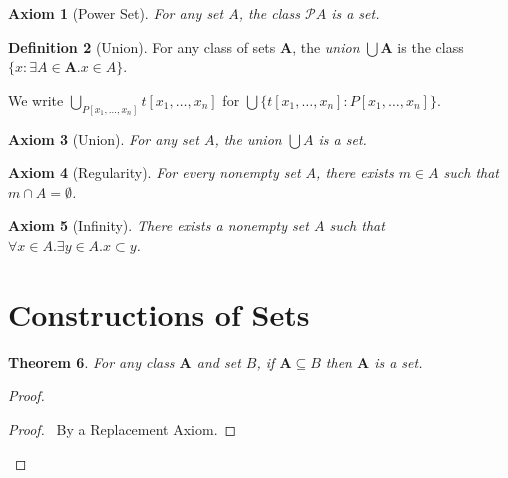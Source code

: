 \documentclass{report}
\let\qed\relax
\newtheorem{axiom}{Axiom}[section]
\newtheorem{theorem}[axiom]{Theorem}
\theoremstyle{definition}
\newtheorem{definition}[axiom]{Definition}
\begin{document}
    \begin{axiom}[Power Set]
        For any set $A$, the class $\mathcal{P} A$ is a set.
    \end{axiom}

    \begin{definition}[Union]
        For any class of sets $\mathbf{A}$, the \emph{union} $\bigcup \mathbf{A}$ is the class
        $\{ x : \exists A \in \mathbf{A}. x \in A \}$.

        We write $\bigcup_{P[x_1, \ldots, x_n]} t[x_1, \ldots, x_n]$ for $\bigcup \{ t[x_1, \ldots, x_n]
        : P[x_1, \ldots, x_n] \}$.
    \end{definition}

    \begin{axiom}[Union]
        For any set $A$, the union $\bigcup A$ is a set.
    \end{axiom}

    \begin{axiom}[Regularity]
        For every nonempty set $A$, there exists $m \in A$ such that $m \cap A = \emptyset$.
    \end{axiom}

    \begin{axiom}[Infinity]
        There exists a nonempty set $A$ such that $\forall x \in A. \exists y \in A. x \subset y$.
    \end{axiom}

    \section{Constructions of Sets}

    \begin{theorem}
        \label{theorem:subset_axiom}
        For any class $\mathbf{A}$ and set $B$, if $\mathbf{A} \subseteq B$ then $\mathbf{A}$ is a set.
    \end{theorem}

    \begin{proof}
        \pf
        \begin{proof}
            \pf\ By a Replacement Axiom.
        \end{proof}
        \qed
    \end{proof}
\end{document}

